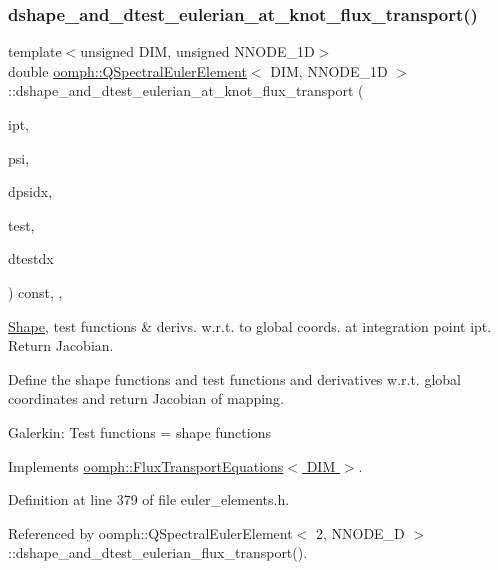 \subsubsection{\texorpdfstring{dshape\+\_\+and\+\_\+dtest\+\_\+eulerian\+\_\+at\+\_\+knot\+\_\+flux\+\_\+transport()}{dshape\_and\_dtest\_eulerian\_at\_knot\_flux\_transport()}}
{\footnotesize\ttfamily template$<$unsigned D\+IM, unsigned N\+N\+O\+D\+E\+\_\+1D$>$ \\
double \hyperlink{classoomph_1_1QSpectralEulerElement}{oomph\+::\+Q\+Spectral\+Euler\+Element}$<$ D\+IM, N\+N\+O\+D\+E\+\_\+1D $>$\+::dshape\+\_\+and\+\_\+dtest\+\_\+eulerian\+\_\+at\+\_\+knot\+\_\+flux\+\_\+transport (\begin{DoxyParamCaption}\item[{const unsigned \&}]{ipt,  }\item[{\hyperlink{classoomph_1_1Shape}{Shape} \&}]{psi,  }\item[{\hyperlink{classoomph_1_1DShape}{D\+Shape} \&}]{dpsidx,  }\item[{\hyperlink{classoomph_1_1Shape}{Shape} \&}]{test,  }\item[{\hyperlink{classoomph_1_1DShape}{D\+Shape} \&}]{dtestdx }\end{DoxyParamCaption}) const\hspace{0.3cm}{\ttfamily [inline]}, {\ttfamily [protected]}, {\ttfamily [virtual]}}



\hyperlink{classoomph_1_1Shape}{Shape}, test functions \& derivs. w.\+r.\+t. to global coords. at integration point ipt. Return Jacobian. 

Define the shape functions and test functions and derivatives w.\+r.\+t. global coordinates and return Jacobian of mapping.

Galerkin\+: Test functions = shape functions 

Implements \hyperlink{classoomph_1_1FluxTransportEquations_a21e7b05ac839ce2db818356ee6906e1c}{oomph\+::\+Flux\+Transport\+Equations$<$ D\+I\+M $>$}.



Definition at line 379 of file euler\+\_\+elements.\+h.



Referenced by oomph\+::\+Q\+Spectral\+Euler\+Element$<$ 2, N\+N\+O\+D\+E\+\_\+D $>$\+::dshape\+\_\+and\+\_\+dtest\+\_\+eulerian\+\_\+flux\+\_\+transport().

\mbox{\label{classoomph_1_1QSpectralEulerElement_a1dc148b0c455243d79387ee6399a29df}} 

